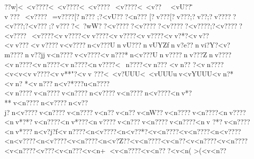 {{{{{{{{{{{{{{{{{{{{{{{{{{{{{{{{{{{{{{{{{{{{{{{{{{{{{{{{{{{{{{{{{{{{{{{{{{{{{{{{{{{{{{{{{{{{{{{{{{{{{{{{{{{{{{{{{{{{{{{{{{{{{{{{{{{{{{{{{{{{{{{{{{{{{{{{{{{{{{{{{{{{{{{{{{{{{{{{{{{{{{{{{{{{{{{{{{{{{{{{{{{{{{{{{{{{{{{{{{{{{{{{{{{{{{{{{{{{{{{{{{{{{{{{{{{{{{{{{{{{{{{{{{{{{{{{{{{{{{{{{{{{{{{{{{{{{{{{{{{{{{{{{{{{{{{{{{{{{{{{{{{{{{{{{{{{{{{{{{{{{{{{{{{{{{{{{{{{{{{{{{{{{{{{{{{{{{{{{{{{{{{{{{{{{{{{{{{{{{{{{{{{{{{{{{{{{{{{{{{{{{{{{{{{{{{{{{{{{{{{{{{{{{{{{{{{{{{{{{{{{{{{{{{{{{{{{{{{{{{{{{{{{{{{{{{{{{{{{{{{{{{{{{{{{{{{{{{{{{{{{{{{{{{{{{{{{{{{{{{{{{{{{{{{{{{{{{{{{{{{{{{{{{{{{{{{{{{{{{{{{{{{{{{{{{{{{{{{{{{{{{{{{{{{{{{{{{{{{{{{{{{{{{{{{{{{{{{{{{{{{{{{{{{{{{{{{{{{{{{{{{{{{{{{{{{{{{{{{{{{{{{{{{{{{{{{{{{{{{{{{{{{{{{{{{{{{{{{{{{{{{{{{{{{{{{{{{{{{{{{{{{{{{{{{{{{{{{{{{{{{{{{{{{{{{{{{{{{{{{{{{{{{{{{{{{{{{{{{{{{{{{{{{{{{{{{{{{{{{{{{{{{{{{{{{{{{{{{{{{{{{{{{{{{{{{{{{{{{{{{{{{{{{{{{{{{{{{{{{{{{{{{{{{{{{{{{{{{{{{{{{{{{{{{{{{{{{{{{{{{{{{{{{{{{{{{{{{{{{{{{{{{{{{{{{{{{{{{{{{{{{{{{{{{{{{{{{{{{{{{{{{{{{{{{{{{{{{{{{{{{{{{{{{{{{{{{{{{{{{{{{{{{{{{{{{{{{{{{{{{{{{{{{{{{{{{{{{{{{{{{{{{{{{{{{{{{{{{{{{{{{{{{{{{{{{{{{{{{{{{{{{{{{{{{{{{{{{{{{{{{{{{{{{{{{{{{{{{{{{{{{{{{{{{{{{{{{{{{{{{{{{{{{{{{{{{{{{{{{{{{{{{{{{{{{{{{{{{{{{{{{{{{{{{{{{{{{{{{{{{{{{{{{{{{{{{{{{{{{{{{{{{{{{{{{{{{{{{{{{{{{{{{{{{{{{{{{{{{{{{{{{{{{{{{{{{{{{{{{{{{{{{{{{{{{{{{{{{{{{{{{{{{{{{{{{{{{{{{{{{{{{{{{{{{{{{{{{{{{{{{{{{{{{{{{{{{{{{{{{{{{{{{{{{{{{{{{{{{{{{{{{{{{{{{{{{{{{{{{{{{{{{{{{{{{{{{{{{{{{{{{{{{{{{{{{{{{{{{{{{{{{{{{{{{{{{{{{{{{{{{{{{{{{{{{{{{{{{{{{{{{{{{{{{{{{{{{{{{{{{{{{{{{{{{{{{{{{{{{{{{{{{{{{{{{{{{{{{{{{{{{{{{{{{{{{{{{{{{{{{{{{{{{{{{{{{{{{{{{{{{{{{{{{{{{{{{{{{{{{{{{{{{{{{{{{{{{{{{{{{{{{{{{{{{{{{{{{{{{{{{{{{{{{{{{{{{{{{{{{{{{{{{{{{{{{{{{{{{{{{{{{{{{{{{{{{{{{{{{{{{{{{{{{{{{{{{{{{{{{{{{{{{{{{{{{{{{{{{{{{{{{{{{{{{{{{{{{{{{{{{{{{{{{{{{{{{{{{{{{{{{{{{{{{{{{{{{{{{{{{{{{{{{{{{{{{{{{{{{{{{{{{{{{{{{{{{{{{{{{{{{{{{{{{{{{{{{{{{{{{{{{{{{{{{{{{{{{{{{{{{{{{{{{{{{{{{{{{{{{{{{{{{{{{{{{{{{{{{{{{{{{{{{{{{{{{{{{{{{{{{{{{{{{{{{{{{{{{{{{{{{{{{{{{{{{{{{{{{{{{{{{{{{{{{{{{{{{{{{{{{{{{{{{{{{{{{{{{{{{{{{{{{{{{{{{{{{{{{{{{{{{{{{{{{{{{{{{{{{{{{{{{{{{{{{{{{{{{{{{{{{{{{{{{{{{{{{{{{{{{{{{{{{{{{{{{{{{{{{{{{{{{{{{{{{{{{{{{{{{{{{{{{{{{{{{{{{{{{{{{{{{{{{{{{{{{{{{{{{{{{??w]<~<v????<~<v????<~<v????~<v????<~<v??~<v}U??\~v???~<v????~=v????[?n???
;?<vU?? ?<n??? [?v??? [?v??? ;?v?? ;?v?????<v??? ;?<v???;?v????<~?wW??<v?????<v?????<v?????<v????;?<v?????<v????~<v????<vv????<vv????<vv????<vv????<vv?*?<vv??<vv???<vv????v<v????n<v???UnvU???nvUYZfnv?e??nvi?Y?<v?m????nv??jjv<n????v<v????<vn???*n<v???Unv????nv???Znv????<vn????<vn????<vn????<nv????<~n????<vn???
<vn??
?<vn????<v<v    <vv????<vv**"?<vv ???<~<v?UUU<~<vUUUuv<vYUUU<vn?*  <vn? *<vn???n<v?*???u<n????<vn????v<n????v<n????n<v????v<n????n<v????<nv*?**v<n????n<v????n<v??j?n<v????v<n????v<n????v<n??v<n??v<nW??v<n????v<n????<nv????<nv*?*?v<n????<nv*???<nv????v<n???v<n????v<n????<nv
?*?v<n????<nv*???n<v?j?f<vn????<n<v????<n<v??*?<v<n????<v<n????<n<v????<n<v????<n<v????<v<n????<n<v?Z??<v<n????<v<n??<v<n????<v<n????<v<n????<v\n? ??<v<n? ??<v<n+
 <v<n????<v<n???<v<n(
>(<v<n? ? }}}}}}}}}}}}}}}}}}}}}}}}}}}}}}}}}}}}}}}}}}}}}}}}}}}}}}}}}}}}}}}}}}}}}}}}}}}}}}}}}}}}}}}}}}}}}}}}}}}}}}}}}}}}}}}}}}}}}}}}}}}}}}}}}}}}}}}}}}}}}}}}}}}}}}}}}}}}}}}}}}}}}}}}}}}}}}}}}}}}}}}}}}}}}}}}}}}}}}}}}}}}}}}}}}}}}}}}}}}}}}}}}}}}}}}}}}}}}}}}}}}}}}}}}}}}}}}}}}}}}}}}}}}}}}}}}}}}}}}}}}}}}}}}}}}}}}}}}}}}}}}}}}}}}}}}}}}}}}}}}}}}}}}}}}}}}}}}}}}}}}}}}}}}}}}}}}}}}}}}}}}}}}}}}}}}}}}}}}}}}}}}}}}}}}}}}}}}}}}}}}}}}}}}}}}}}}}}}}}}}}}}}}}}}}}}}}}}}}}}}}}}}}}}}}}}}}}}}}}}}}}}}}}}}}}}}}}}}}}}}}}}}}}}}}}}}}}}}}}}}}}}}}}}}}}}}}}}}}}}}}}}}}}}}}}}}}}}}}}}}}}}}}}}}}}}}}}}}}}}}}}}}}}}}}}}}}}}}}}}}}}}}}}}}}}}}}}}}}}}}}}}}}}}}}}}}}}}}}}}}}}}}}}}}}}}}}}}}}}}}}}}}}}}}}}}}}}}}}}}}}}}}}}}}}}}}}}}}}}}}}}}}}}}}}}}}}}}}}}}}}}}}}}}}}}}}}}}}}}}}}}}}}}}}}}}}}}}}}}}}}}}}}}}}}}}}}}}}}}}}}}}}}}}}}}}}}}}}}}}}}}}}}}}}}}}}}}}}}}}}}}}}}}}}}}}}}}}}}}}}}}}}}}}}}}}}}}}}}}}}}}}}}}}}}}}}}}}}}}}}}}}}}}}}}}}}}}}}}}}}}}}}}}}}}}}}}}}}}}}}}}}}}}}}}}}}}}}}}}}}}}}}}}}}}}}}}}}}}}}}}}}}}}}}}}}}}}}}}}}}}}}}}}}}}}}}}}}}}}}}}}}}}}}}}}}}}}}}}}}}}}}}}}}}}}}}}}}}}}}}}}}}}}}}}}}}}}}}}}}}}}}}}}}}}}}}}}}}}}}}}}}}}}}}}}}}}}}}}}}}}}}}}}}}}}}}}}}}}}}}}}}}}}}}}}}}}}}}}}}}}}}}}}}}}}}}}}}}}}}}}}}}}}}}}}}}}}}}}}}}}}}}}}}}}}}}}}}}}}}}}}}}}}}}}}}}}}}}}}}}}}}}}}}}}}}}}}}}}}}}}}}}}}}}}}}}}}}}}}}}}}}}}}}}}}}}}}}}}}}}}}}}}}}}}}}}}}}}}}}}}}}}}}}}}}}}}}}}}}}}}}}}}}}}}}}}}}}}}}}}}}}}}}}}}}}}}}}}}}}}}}}}}}}}}}}}}}}}}}}}}}}}}}}}}}}}}}}}}}}}}}}}}}}}}}}}}}}}}}}}}}}}}}}}}}}}}}}}}}}}}}}}}}}}}}}}}}}}}}}}}}}}}}}}}}}}}}}}}}}}}}}}}}}}}}}}}}}}}}}}}}}}}}}}}}}}}}}}}}}}}}}}}}}}}}}}}}}}}}}}}}}}}}}}}}}}}}}}}}}}}}}}}}}}}}}}}}}}}}}}}}}}}}}}}}}}}}}}}}}}}}}}}}}}}}}}}}}}}}}}}}}}}}}}}}}}}}}}}}}}}}}}}}}}}}}}}}}}}}}}}}}}}}}}}}}}}}}}}}}}}}}}}}}}}}}}}}}}}}}}}}}}}}}}}}}}}}}}}}}}}}}}}}}}}}}}}}}}}}}}}}}}}}}}}}}}}}}}}}}}}}}}}}}}}}}}}}}}}}}}}}}}}}}}}}}}}}}}}}}}}}}}}}}}}}}}}}}}}}}}}}}}}}}}}}}}}}}}}}}}}}}}}}}}}}}}}}}}}}}}}}}}}}}}}}}}}}}}}}}}}}}}}}}}}}}}}}}}}}}}}}}}}}}}}}}}}}}}}}}}}}}}}}}}}}}}}}}}}}}}}}}}}}}}}}}}}}}}}}}}}}}}}}}}}}}}}}}}}}}}}}}}}}}}}}}}}}}}}}}}}}}}}}}}}}}}}}}}}}}}}}}}}}}}}}}}}}}}}}}}}}}}}}}}}}}}}}}}}}}}}}}}}}}}}}}}}}}}}}}}}}}}}}}}}}}}}}}}}}}}}}}}}}}}}}}}}}}}}}}}}}}}}}}}}}}}}}}}}}}}}}}}}}}}}}}}}}}}}}}}}}}}}}}}}}}}}}}}}}}}}}}}}}}}}}}}}}}}}}}}}}}}}}}}}}}}}}}}}}}
